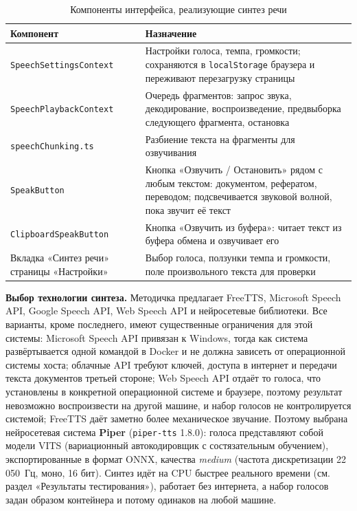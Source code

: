 \begin{table}[H]
  \centering
  \caption{Компоненты интерфейса, реализующие синтез речи}
  \label{tab:frontend-components}
  \small
  \begin{tabular}{|p{}|p{}|}
    \hline
    \textbf{Компонент} & \textbf{Назначение} \\
    \hline
    \texttt{SpeechSettingsContext} & Настройки голоса, темпа, громкости; сохраняются в \texttt{localStorage} браузера и переживают перезагрузку страницы \\
    \hline
    \texttt{SpeechPlaybackContext} & Очередь фрагментов: запрос звука, декодирование, воспроизведение, предвыборка следующего фрагмента, остановка \\
    \hline
    \texttt{speechChunking.ts} & Разбиение текста на фрагменты для озвучивания \\
    \hline
    \texttt{SpeakButton} & Кнопка «Озвучить / Остановить» рядом с любым текстом: документом, рефератом, переводом; подсвечивается звуковой волной, пока звучит её текст \\
    \hline
    \texttt{ClipboardSpeakButton} & Кнопка «Озвучить из буфера»: читает текст из буфера обмена и озвучивает его \\
    \hline
    Вкладка «Синтез речи» страницы «Настройки» & Выбор голоса, ползунки темпа и громкости, поле произвольного текста для проверки \\
    \hline
  \end{tabular}
\end{table}


\textbf{Выбор технологии синтеза.} Методичка предлагает FreeTTS,
Microsoft Speech API, Google Speech API, Web Speech API и нейросетевые
библиотеки. Все варианты, кроме последнего, имеют существенные
ограничения для этой системы: Microsoft Speech API привязан к
Windows, тогда как система развёртывается одной командой в Docker и
не должна зависеть от операционной системы хоста; облачные API
требуют ключей, доступа в интернет и передачи текста документов
третьей стороне; Web Speech API отдаёт то голоса, что установлены в
конкретной операционной системе и браузере, поэтому результат
невозможно воспроизвести на другой машине, и набор голосов не
контролируется системой; FreeTTS даёт заметно более механическое
звучание. Поэтому выбрана нейросетевая система \textbf{Piper}
(\texttt{piper-tts} 1.8.0): голоса представляют собой модели VITS
(вариационный автокодировщик с состязательным обучением), экспортированные в
формат ONNX, качества \emph{medium} (частота дискретизации 22\,050~Гц,
моно, 16 бит). Синтез идёт на CPU быстрее реального времени (см.
раздел «Результаты тестирования»), работает без интернета, а набор
голосов задан образом контейнера и потому одинаков на любой машине.

